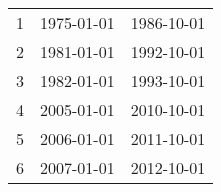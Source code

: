 % 
\begin{tabular}{ccc}
  \hline
  \hline
1 & 1975-01-01 & 1986-10-01 \\ 
  2 & 1981-01-01 & 1992-10-01 \\ 
  3 & 1982-01-01 & 1993-10-01 \\ 
  4 & 2005-01-01 & 2010-10-01 \\ 
  5 & 2006-01-01 & 2011-10-01 \\ 
  6 & 2007-01-01 & 2012-10-01 \\ 
   \hline
\end{tabular}
